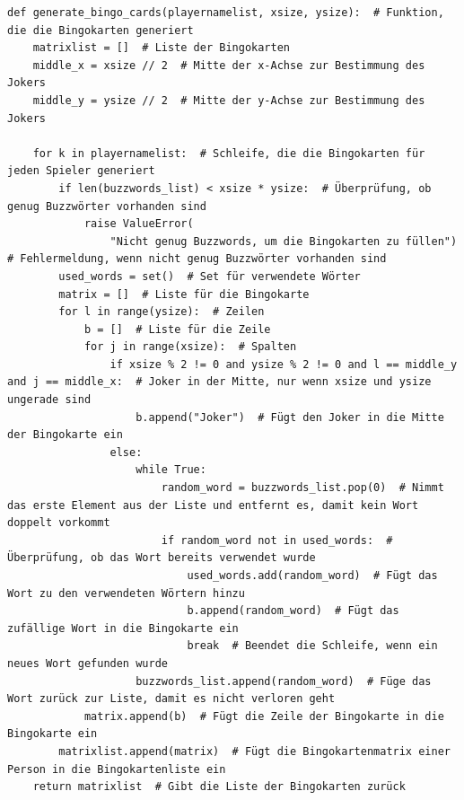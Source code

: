 \documentclass{llncs}
\begin{document}
\begin{lstlisting}[caption=Generierung der Bingokarten]
    def generate_bingo_cards(playernamelist, xsize, ysize):  # Funktion, die die Bingokarten generiert
    matrixlist = []  # Liste der Bingokarten
    middle_x = xsize // 2  # Mitte der x-Achse zur Bestimmung des Jokers
    middle_y = ysize // 2  # Mitte der y-Achse zur Bestimmung des Jokers

    for k in playernamelist:  # Schleife, die die Bingokarten für jeden Spieler generiert
        if len(buzzwords_list) < xsize * ysize:  # Überprüfung, ob genug Buzzwörter vorhanden sind
            raise ValueError(
                "Nicht genug Buzzwords, um die Bingokarten zu füllen")  # Fehlermeldung, wenn nicht genug Buzzwörter vorhanden sind
        used_words = set()  # Set für verwendete Wörter
        matrix = []  # Liste für die Bingokarte
        for l in range(ysize):  # Zeilen
            b = []  # Liste für die Zeile
            for j in range(xsize):  # Spalten
                if xsize % 2 != 0 and ysize % 2 != 0 and l == middle_y and j == middle_x:  # Joker in der Mitte, nur wenn xsize und ysize ungerade sind
                    b.append("Joker")  # Fügt den Joker in die Mitte der Bingokarte ein
                else:
                    while True:
                        random_word = buzzwords_list.pop(0)  # Nimmt das erste Element aus der Liste und entfernt es, damit kein Wort doppelt vorkommt
                        if random_word not in used_words:  # Überprüfung, ob das Wort bereits verwendet wurde
                            used_words.add(random_word)  # Fügt das Wort zu den verwendeten Wörtern hinzu
                            b.append(random_word)  # Fügt das zufällige Wort in die Bingokarte ein
                            break  # Beendet die Schleife, wenn ein neues Wort gefunden wurde
                    buzzwords_list.append(random_word)  # Füge das Wort zurück zur Liste, damit es nicht verloren geht
            matrix.append(b)  # Fügt die Zeile der Bingokarte in die Bingokarte ein
        matrixlist.append(matrix)  # Fügt die Bingokartenmatrix einer Person in die Bingokartenliste ein
    return matrixlist  # Gibt die Liste der Bingokarten zurück

\end{lstlisting}
\end{document}
